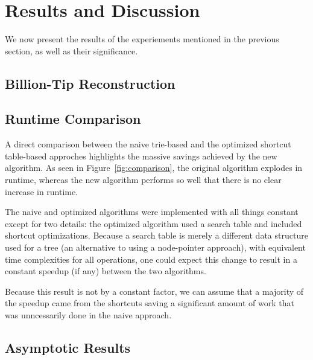 \section{Results and Discussion} \label{sec:results}

We now present the results of the experiements mentioned in the previous section, as well as their significance.

\subsection{Billion-Tip Reconstruction}



\subsection{Runtime Comparison}

A direct comparison between the naive trie-based and the optimized shortcut table-based approches highlights the massive savings achieved by the new algorithm. As seen in Figure~\ref{fig:comparison}, the original algorithm explodes in runtime, whereas the new algorithm performs so well that there is no clear increase in runtime.



The naive and optimized algorithms were implemented with all things constant except for two details: the optimized algorithm used a search table and included shortcut optimizations. Because a search table is merely a different data structure used for a tree (an alternative to using a node-pointer approach), with equivalent time complexities for all operations, one could expect this change to result in a constant speedup (if any) between the two algorithms.

Because this result is not by a constant factor, we can assume that a majority of the speedup came from the shortcuts saving a significant amount of work that was unncessarily done in the naive approach. 

\subsection{Asymptotic Results} \label{sec:results:asymptotic}

